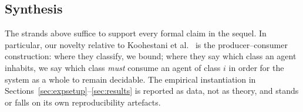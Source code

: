 \subsection{Synthesis}

The strands above suffice to support every formal claim in the
sequel.  In particular, our novelty relative to
Koohestani et al.~\cite{koohestani2025automata} is the
producer--consumer construction: where they classify, we bound;
where they say which class an agent inhabits, we say which class
\emph{must} consume an agent of class $i$ in order for the system
as a whole to remain decidable.  The empirical instantiation in
Sections~\ref{sec:expsetup}--\ref{sec:results} is reported as
data, not as theory, and stands or falls on its own
reproducibility artefacts.
